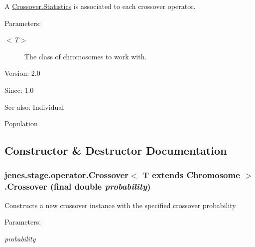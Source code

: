 A \hyperlink{}{Crossover.Statistics} is associated to each crossover operator.

\begin{Desc}
\item[Parameters:]
\begin{description}
\item[{\em $<$T$>$}]The class of chromosomes to work with.\end{description}
\end{Desc}
\begin{Desc}
\item[Version:]2.0 \end{Desc}
\begin{Desc}
\item[Since:]1.0\end{Desc}
\begin{Desc}
\item[See also:]Individual 

Population \end{Desc}


\subsection{Constructor \& Destructor Documentation}
\hypertarget{classjenes_1_1stage_1_1operator_1_1_crossover_3_01_t_01extends_01_chromosome_01_4_2287f5646b08b9c3167934ee620f2d6e}{
\subsubsection[Crossover]{\setlength{\rightskip}{0pt plus 5cm}jenes.stage.operator.Crossover$<$ T extends Chromosome $>$.Crossover (final double {\em probability})}}
\label{classjenes_1_1stage_1_1operator_1_1_crossover_3_01_t_01extends_01_chromosome_01_4_2287f5646b08b9c3167934ee620f2d6e}


Constructs a new crossover instance with the specified crossover probability

\begin{Desc}
\item[Parameters:]
\begin{description}
\item[{\em probability}]\end{description}
\end{Desc}


